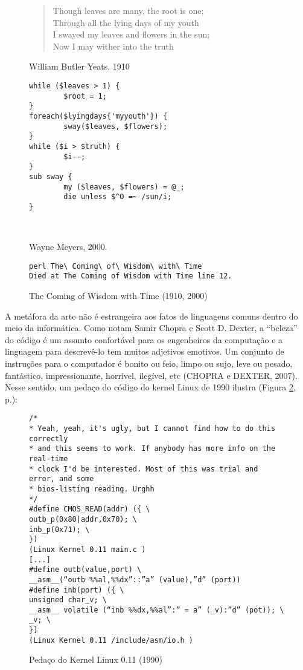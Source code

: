 \begin{figure}[htb]
\caption{The Coming of Wisdom with Time (1910, 2000)} \label{fig2.1}
\begin{multicols}{2}

\begin{verse}
Though leaves are many, the root is one;\\
Through all the lying days of my youth\\
I swayed my leaves and flowers in the sun;\\
Now I may wither into the truth\\
\end{verse}
\begin{flushright}
William Butler Yeats, 1910
\end{flushright}

\columnbreak
{\scriptsize
\begin{verbatim}
while ($leaves > 1) {
        $root = 1;
}
foreach($lyingdays{'myyouth'}) {
        sway($leaves, $flowers);
}
while ($i > $truth) {
        $i--;
}
sub sway {
        my ($leaves, $flowers) = @_;
        die unless $^O =~ /sun/i;
}
\end{verbatim}
}\\
\begin{flushright}
Wayne Meyers, 2000.\\
\end{flushright}
{\scriptsize
\begin{verbatim}
perl The\ Coming\ of\ Wisdom\ with\ Time 
Died at The Coming of Wisdom with Time line 12.
\end{verbatim}
}
\end{multicols}
\end{figure}

A metáfora da arte não é estrangeira aos fatos de linguagens comuns dentro do meio da informática. Como notam Samir Chopra e Scott D. Dexter, a “beleza” do código é um assunto confortável para os engenheiros da computação e a linguagem para descrevê-lo tem muitos adjetivos emotivos. Um conjunto de instruções para o computador é bonito ou feio, limpo ou sujo, leve ou pesado, fantástico, impressionante, horrível, ilegível, etc (CHOPRA e DEXTER, 2007). Nesse sentido, um pedaço do código do kernel Linux de 1990 ilustra (Figura \ref{fig2.2}, p.\pageref{fig2.2}):

\begin{figure}[h]
\caption{Pedaço do Kernel Linux 0.11 (1990)} \label{fig2.2}
{\footnotesize
\begin{verbatim}
/*
* Yeah, yeah, it's ugly, but I cannot find how to do this correctly
* and this seems to work. If anybody has more info on the real-time
* clock I'd be interested. Most of this was trial and error, and some
* bios-listing reading. Urghh
*/
#define CMOS_READ(addr) ({ \
outb_p(0x80|addr,0x70); \
inb_p(0x71); \
})
(Linux Kernel 0.11 main.c )
[...]
#define outb(value,port) \
__asm__(“outb %%al,%%dx”::”a” (value),”d” (port))
#define inb(port) ({ \
unsigned char_v; \
__asm__ volatile (“inb %%dx,%%al”:” = a” (_v):”d” (pot)); \
_v; \
}]
(Linux Kernel 0.11 /include/asm/io.h )
\end{verbatim}
}
\end{figure}

